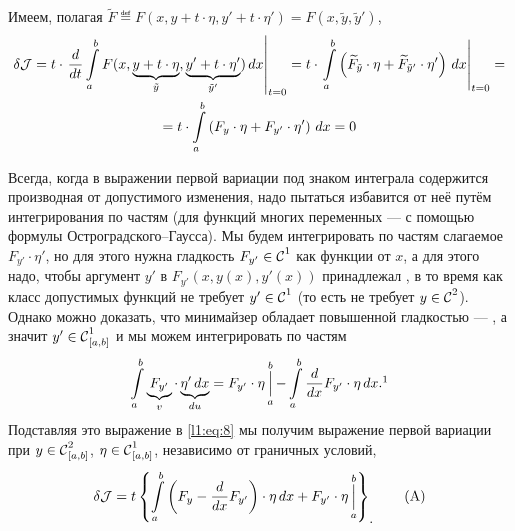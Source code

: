 Имеем, полагая $\widetilde{F}\eqdef F(x,y+t\cdot\eta,y'+t\cdot\eta')=F(x,\tilde{y},\tilde{y}')$,
\begin{multline}
	\label{l1:eq:8}
	\delta\J=t\cdot\left.\der{}{t}\int\limits_a^b F(x,\underbrace{y+t\cdot\eta}_{\tilde{y}},\underbrace{y'+t\cdot\eta'}_{\tilde{y}'})\,\dd{x}\right|_{t=0}=t\cdot\left.\int\limits_a^b \left(\widetilde{F}_{\tilde{y}}\cdot\eta+\widetilde{F}_{\tilde{y}'}\cdot\eta'\right)\,\dd{x}\right|_{t=0}=\\
	=t\cdot\int\limits_a^b \left({F}_{{y}}\cdot\eta+{F}_{{y}'}\cdot\eta'\right)\,\dd{x}=0
\end{multline}

Всегда, когда в выражении первой вариации под знаком интеграла содержится производная от допустимого изменения, надо пытаться избавится от неё путём интегрирования по частям (для функций многих переменных --- с помощью формулы Остроградского--Гаусса). Мы будем интегрировать по частям слагаемое $F_{y'}\cdot\eta'$, но для этого нужна гладкость $F_{y'}\in\Cfn[]{1}$ как функции от $x$, а для этого надо, чтобы аргумент $y'$ в $F_{y'}(x,y(x),y'(x))$ принадлежал , в то время как класс допустимых функций не требует $y'\in\Cfn[]{1}$ (то есть не требует $y\in\Cfn[]{2}$). Однако можно доказать, что минимайзер обладает повышенной гладкостью --- , а значит $y'\in\Cfn[{[a,b]}]{1}$ и мы можем интегрировать по частям
\begin{equation}
	\label{l1:eq:9}
	\hfill\int\limits_a^b \underbrace{F_{y'}}_{v}\cdot\underbrace{\eta'\,\dd{x}}_{du}=F_{y'}\cdot\eta\mathop{\Big|}\limits_a^b-\int\limits_a^b \der{}{x}F_{y'}\cdot\eta\,\dd{x}.\footnotemark{}\hfill
\end{equation}
Подставляя это выражение в \eqref{l1:eq:8} мы получим выражение первой вариации при $y\in\Cfn[{[a,b]}]{2}$, $\eta\in\Cfn[{[a,b]}]{1}$, независимо от граничных условий,
\begin{equation}
	\label{l1:eq:A}
	\hfill \delta\J=t\left\{\int\limits_a^b\left(F_y-\der{}{x}F_{y'}\right)\cdot\eta\,\dd{x}+F_{y'}\cdot\eta\mathop{\Big|}\limits_a^b\right\}_{\displaystyle.}\hfill\tag{A}
\end{equation}

